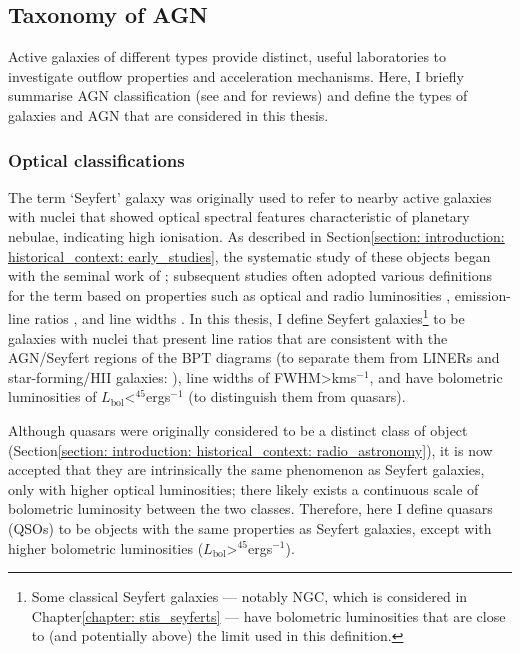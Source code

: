 \subsection{Taxonomy of AGN}
\label{section: introduction: outflows: taxonomy_of_agn}

Active galaxies of different types provide distinct, useful laboratories to investigate outflow properties and acceleration mechanisms. Here, I briefly summarise AGN classification (see \citealt{Netzer2015} and \citealt{Tadhunter2008, Tadhunter2016} for reviews) and define the types of galaxies and AGN that are considered in this thesis. 

\subsubsection{Optical classifications}
\label{section: introduction: outflows: taxonomy_of_agn: seyferts_and_quasars}

The term `Seyfert' galaxy was originally used to refer to nearby active galaxies with nuclei that showed optical spectral features characteristic of planetary nebulae, indicating high ionisation. As described in Section\;\ref{section: introduction: historical_context: early_studies}, the systematic study of these objects began with the seminal work of \citet{Seyfert1943}; subsequent studies often adopted various definitions for the term based on properties such as optical and radio luminosities \citep{Wilson1980}, emission-line ratios \citep{Baldwin1981}, and line widths \citep{Whittle1992a}. In this thesis, I define Seyfert galaxies\footnote{Some classical Seyfert galaxies --- notably NGC, which is considered in Chapter\;\ref{chapter: stis_seyferts} --- have bolometric luminosities that are close to (and potentially above) the limit used in this definition.} to be galaxies with nuclei that present line ratios that are consistent with the AGN/Seyfert regions of the BPT diagrams (to separate them from LINERs and star-forming/HII galaxies: \citealt{Baldwin1981, Kewley2006}), line widths of FWHM\;\textgreater{}\;km\;s$^{-1}$, and have bolometric luminosities of $L_\mathrm{bol}$\;\textless{}$^{45}$\;erg\;s$^{-1}$ (to distinguish them from quasars).

Although quasars were originally considered to be a distinct class of object (Section\;\ref{section: introduction: historical_context: radio_astronomy}), it is now accepted that they are intrinsically the same phenomenon as Seyfert galaxies, only with higher optical luminosities; there likely exists a continuous scale of bolometric luminosity between the two classes. Therefore, here I define quasars (QSOs) to be objects with the same properties as Seyfert galaxies, except with higher bolometric luminosities ($L_\mathrm{bol}$\;\textgreater{}$^{45}$\;erg\;s$^{-1}$).

